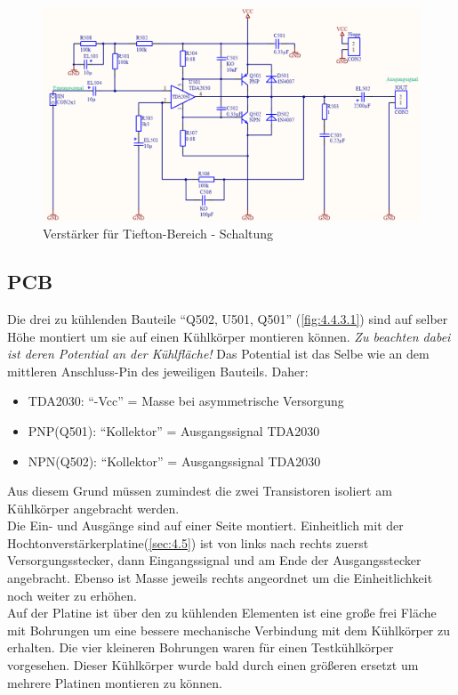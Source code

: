 \begin{figure} [H]
	\centering	
	\includegraphics[width=1\textwidth]{img/Print5/5_TTVerstaerker-Schem.PNG}
	\caption{Verstärker für Tiefton-Bereich - Schaltung}
	\label {fig:4.4.2.1}
\end{figure}


\subsection{PCB}\label{subsec:4.4.3}
Die drei zu kühlenden Bauteile \enquote{Q502, U501, Q501} (\ref{fig:4.4.3.1}) sind auf selber Höhe montiert um sie auf einen Kühlkörper montieren können.
\emph{Zu beachten dabei ist deren Potential an der Kühlfläche!}
Das Potential ist das Selbe wie an dem mittleren Anschluss-Pin des jeweiligen Bauteils.
Daher:
\begin{itemize}
	\item TDA2030: \enquote{-Vcc} = Masse bei asymmetrische Versorgung
	\item PNP(Q501): \enquote{Kollektor} = Ausgangssignal TDA2030
	\item NPN(Q502): \enquote{Kollektor} = Ausgangssignal TDA2030
\end{itemize}

Aus diesem Grund müssen zumindest die zwei Transistoren isoliert am Kühlkörper angebracht werden.\\
Die Ein- und Ausgänge sind auf einer Seite montiert. 
Einheitlich mit der Hochtonverstärkerplatine(\ref{sec:4.5}) ist von links nach rechts zuerst Versorgungsstecker, dann Eingangssignal und am Ende der Ausgangsstecker angebracht.
Ebenso ist Masse jeweils rechts angeordnet um die Einheitlichkeit noch weiter zu erhöhen.\\
Auf der Platine ist über den zu kühlenden Elementen ist eine große frei Fläche mit Bohrungen um eine bessere mechanische Verbindung mit dem Kühlkörper zu erhalten.
Die vier kleineren Bohrungen waren für einen Testkühlkörper vorgesehen. 
Dieser Kühlkörper wurde bald durch einen größeren ersetzt um mehrere Platinen montieren zu können.

